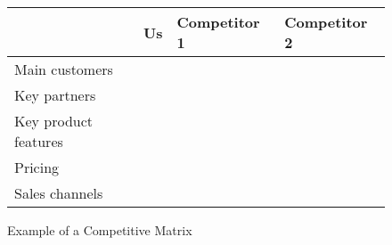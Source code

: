\begin{figure}[!htb]
	\centering
	\caption{Example of a Competitive Matrix}
	\label{fig:competitive-matrix}
	\begin{tabular}{ l | l l l }
		& Us & Competitor 1 & Competitor 2 \\
		\hline
		Main customers \\
		Key partners \\
		Key product features \\
		Pricing \\
		Sales channels
	\end{tabular}
\end{figure}

\clearpage
